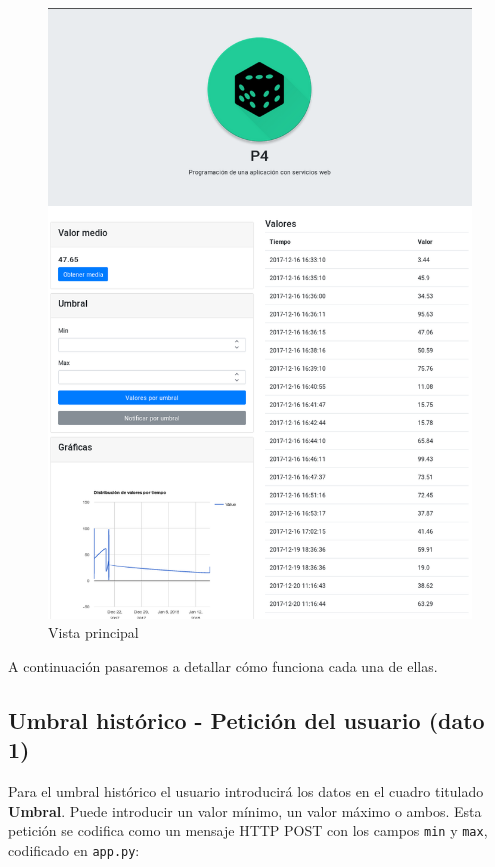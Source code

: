 \documentclass{article}
\begin{document}
\begin{figure}
\centering
\includegraphics[width=\textwidth]{main.png}
\caption{Vista principal}
\end{figure}

A continuación pasaremos a detallar cómo funciona cada una de ellas.

\subsection{Umbral histórico - Petición del usuario (dato 1)}

Para el umbral histórico el usuario introducirá los datos en el cuadro titulado \textbf{Umbral}. Puede introducir un valor mínimo, un valor máximo o ambos. Esta petición se codifica como un mensaje HTTP POST con los campos \texttt{min} y \texttt{max}, codificado en \texttt{app.py}:
\end{document}
